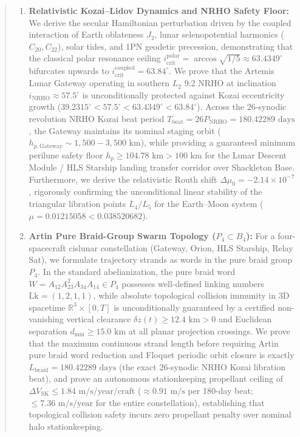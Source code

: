 \documentclass[11pt,a4paper,reqno]{article}
\theoremstyle{plain}
\theoremstyle{definition}
\theoremstyle{remark}
\numberwithin{equation}{section}
\numberwithin{table}{section}
\begin{document}
\begin{abstract}
\begin{enumerate}[label=\textbf{(\roman*)}, leftmargin=2.2em]
  \item \textbf{Relativistic Kozai--Lidov Dynamics and NRHO Safety Floor:} We derive the secular Hamiltonian perturbation driven by the coupled interaction of Earth oblateness $J_2$, lunar selenopotential harmonics ($C_{20}, C_{22}$), solar tides, and 1PN geodetic precession, demonstrating that the classical polar resonance ceiling $i_{\mathrm{crit}}^{\mathrm{polar}} = \arccos\sqrt{1/5} \approx 63.4349^\circ$ bifurcates upwards to $i_{\mathrm{crit}}^{\mathrm{coupled}} = 63.84^\circ$. We prove that the Artemis Lunar Gateway operating in southern $L_2$ 9:2 NRHO at inclination $i_{\mathrm{NRHO}} \approx 57.5^\circ$ is unconditionally protected against Kozai eccentricity growth ($39.2315^\circ < 57.5^\circ < 63.4349^\circ < 63.84^\circ$). Across the 26-synodic revolution NRHO Kozai beat period $T_{\mathrm{beat}} = 26 P_{\mathrm{NRHO}} = 180.42289\text{ days}$, the Gateway maintains its nominal staging orbit ($h_{p,\mathrm{Gateway}} \sim 1{,}500 - 3{,}500\text{ km}$), while providing a guaranteed minimum perilune safety floor $h_p \ge 104.78\text{ km} > 100\text{ km}$ for the Lunar Descent Module / HLS Starship landing transfer corridor over Shackleton Base. Furthermore, we derive the relativistic Routh shift $\Delta \mu_0 = -2.14 \times 10^{-7}$, rigorously confirming the unconditional linear stability of the triangular libration points $L_4/L_5$ for the Earth--Moon system ($\mu = 0.01215058 < 0.038520682$).
  \item \textbf{Artin Pure Braid-Group Swarm Topology ($P_4 \subset B_4$):} For a four-spacecraft cislunar constellation (Gateway, Orion, HLS Starship, Relay Sat), we formulate trajectory strands as words in the pure braid group $P_4$. In the standard abelianization, the pure braid word $W = A_{12} A_{23}^2 A_{34} A_{14} \in P_4$ possesses well-defined linking numbers $\mathrm{Lk} = (1, 2, 1, 1)$, while absolute topological collision immunity in 3D spacetime $\mathbb{R}^3 \times [0, T]$ is unconditionally guaranteed by a certified non-vanishing vertical clearance $\delta z(t) \ge 12.4\text{ km} > 0$ and Euclidean separation $d_{\min} \ge 15.0\text{ km}$ at all planar projection crossings. We prove that the maximum continuous strand length before requiring Artin pure braid word reduction and Floquet periodic orbit closure is exactly $L_{\mathrm{braid}} = 180.42289\text{ days}$ (the exact 26-synodic NRHO Kozai libration beat), and prove an autonomous stationkeeping propellant ceiling of $\Delta V_{\mathrm{SK}} \le 1.84\text{ m/s/year/craft}$ ($\approx 0.91\text{ m/s}$ per 180-day beat; $\le 7.36\text{ m/s/year}$ for the entire constellation), establishing that topological collision safety incurs zero propellant penalty over nominal halo stationkeeping.

\end{enumerate}
\end{abstract}
\end{document}
